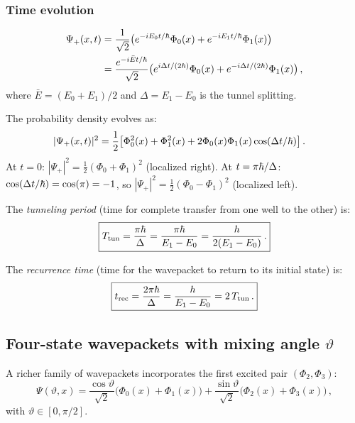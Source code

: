 \subsubsection{Time evolution}

\begin{align}
  \Psi_+(x, t) &= \frac{1}{\sqrt{2}}\bigl(e^{-iE_0 t/\hbar}\Phi_0(x) + e^{-iE_1 t/\hbar}\Phi_1(x)\bigr)\notag\\
  &= \frac{e^{-i\bar{E}t/\hbar}}{\sqrt{2}}\bigl(e^{i\Delta t/(2\hbar)}\Phi_0(x) + e^{-i\Delta t/(2\hbar)}\Phi_1(x)\bigr)\,,
\end{align}
where $\bar{E} = (E_0+E_1)/2$ and $\Delta = E_1 - E_0$ is the tunnel splitting.

The probability density evolves as:
\begin{align}
  |\Psi_+(x,t)|^2 &= \frac{1}{2}\bigl[\Phi_0^2(x) + \Phi_1^2(x) + 2\Phi_0(x)\Phi_1(x)\cos(\Delta t/\hbar)\bigr]\,.
\end{align}
At $t = 0$: $|\Psi_+|^2 = \frac{1}{2}(\Phi_0+\Phi_1)^2$ (localized right).
At $t = \pi\hbar/\Delta$: $\cos(\Delta t/\hbar) = \cos(\pi) = -1$, so $|\Psi_+|^2 = \frac{1}{2}(\Phi_0-\Phi_1)^2$ (localized left).

The \emph{tunneling period} (time for complete transfer from one well to the other) is:
\begin{equation}\label{eq:T_tunnel}
  \boxed{T_{\text{tun}} = \frac{\pi\hbar}{\Delta} = \frac{\pi\hbar}{E_1 - E_0} = \frac{h}{2(E_1-E_0)}\,.}
\end{equation}

The \emph{recurrence time} (time for the wavepacket to return to its initial state) is:
\begin{equation}\label{eq:t_rec}
  \boxed{t_{\text{rec}} = \frac{2\pi\hbar}{\Delta} = \frac{h}{E_1 - E_0} = 2\,T_{\text{tun}}\,.}
\end{equation}

\subsection{Four-state wavepackets with mixing angle $\vartheta$}\label{sec:4state}

A richer family of wavepackets incorporates the first excited pair $(\Phi_2, \Phi_3)$:
\begin{equation}\label{eq:Psi_theta}
  \Psi(\vartheta, x) = \frac{\cos\vartheta}{\sqrt{2}}\bigl(\Phi_0(x) + \Phi_1(x)\bigr)
  + \frac{\sin\vartheta}{\sqrt{2}}\bigl(\Phi_2(x) + \Phi_3(x)\bigr)\,,
\end{equation}
with $\vartheta \in [0, \pi/2]$.


